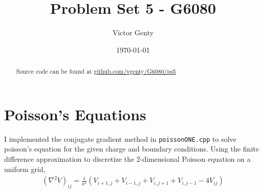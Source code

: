 \documentclass[singlepage,notitlepage,nofootinbib,11pt]{revtex4-1}
\begin{document}
\title{Problem Set 5 - G6080}
\author{Victor Genty}
\date{\today}
\begin{abstract}
\centering
Source code can be found at \href{https://github.com/vgenty/G6080/tree/master/ps5}{github.com/vgenty/G6080/ps5}
\end{abstract}
\maketitle
\section{Poisson's Equations}
I implemented the conjugate gradient method in \texttt{poissonONE.cpp} to solve poisson's equation for the given charge and boundary conditions. Using the finite difference approximation to discretize the 2-dimensional Poisson equation on a uniform grid,
\begin{align*}
(\nabla^2 V)_{ij} = \frac{1}{a^2}\left(V_{i+1,j} + V_{i-1,j} + V_{i,j+1} + V_{i,j-1} - 4V_{ij}\right)
\end{align*}
\end{document}
